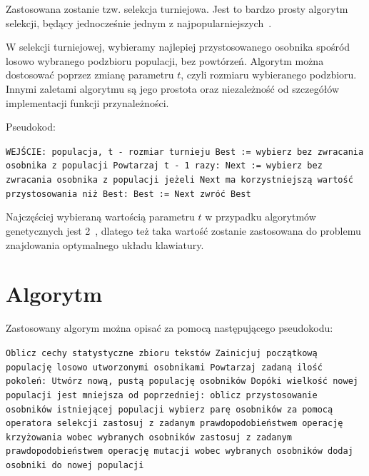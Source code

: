 \documentclass[brudnopis]{xmgr}
\begin{document}
Zastosowana zostanie tzw. selekcja turniejowa. Jest to bardzo prosty algorytm selekcji, będący jednocześnie jednym z najpopularniejszych~\cite{Luke2009Metaheuristics}.

W selekcji turniejowej, wybieramy najlepiej przystosowanego osobnika spośród losowo wybranego podzbioru populacji, bez powtórzeń. Algorytm można dostosować poprzez zmianę parametru $t$, czyli rozmiaru wybieranego podzbioru. Innymi zaletami algorytmu są jego prostota oraz niezależność od szczegółów implementacji funkcji przynależności.

Pseudokod:\newline

\noindent
\texttt{WEJŚCIE: populacja, t - rozmiar turnieju\newline
Best := wybierz bez zwracania osobnika z populacji\newline
Powtarzaj t - 1 razy:\newline
\indent Next := wybierz bez zwracania osobnika z populacji\newline
\indent jeżeli Next ma korzystniejszą wartość przystosowania niż Best:\newline
\indent\indent Best := Next\newline
zwróć Best\newline
}

Najczęściej wybieraną wartością parametru $t$ w przypadku algorytmów genetycznych jest 2~\cite{Luke2009Metaheuristics}, dlatego też taka wartość zostanie zastosowana do problemu znajdowania optymalnego układu klawiatury.


\section{Algorytm}

Zastosowany algorym można opisać za pomocą następującego pseudokodu:\newline

\noindent
\texttt{Oblicz cechy statystyczne zbioru tekstów\newline
Zainicjuj początkową populację losowo utworzonymi osobnikami\newline
Powtarzaj zadaną ilość pokoleń:\newline
\indent Utwórz nową, pustą populację osobników\newline
\indent Dopóki wielkość nowej populacji jest mniejsza od poprzedniej:\newline
\indent\indent oblicz przystosowanie osobników istniejącej populacji\newline
\indent\indent wybierz parę osobników za pomocą operatora selekcji\newline
\indent\indent zastosuj z zadanym prawdopodobieństwem operację krzyżowania\newline
\indent\indent wobec wybranych osobników\newline
\indent\indent zastosuj z zadanym prawdopodobieństwem operację mutacji\newline
\indent\indent wobec wybranych osobników\newline
\indent\indent dodaj osobniki do nowej populacji\newline
}
\end{document}
